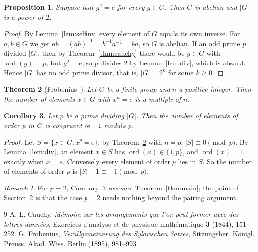 \documentclass[11pt]{amsart}
\newtheorem{theorem}{Theorem}[section]
\newtheorem{proposition}[theorem]{Proposition}
\newtheorem{corollary}[theorem]{Corollary}
\theoremstyle{definition}
\theoremstyle{remark}
\newtheorem*{remark}{Remark}
\DeclareMathOperator{\ord}{ord}
\begin{document}
\begin{proposition}\label{prop:exp2}
Suppose that $g^2=e$ for every $g\in G$. Then $G$ is abelian and $|G|$ is a power of $2$.
\end{proposition}

\begin{proof}
By Lemma~\ref{lem:selfinv} every element of $G$ equals its own inverse. For $a,b\in G$ we get
$ab=(ab)^{-1}=b^{-1}a^{-1}=ba$, so $G$ is abelian. If an odd prime $p$ divided $|G|$, then by
Theorem~\ref{thm:cauchy} there would be $g\in G$ with $\ord(g)=p$; but $g^2=e$, so $p$ divides
$2$ by Lemma~\ref{lem:div}, which is absurd. Hence $|G|$ has no odd prime divisor, that is,
$|G|=2^k$ for some $k\ge 0$.
\end{proof}

\begin{theorem}[Frobenius~\cite{Frobenius}]\label{thm:frob}
Let $G$ be a finite group and $n$ a positive integer. Then the number of elements $x\in G$
with $x^n=e$ is a multiple of $n$.
\end{theorem}

\begin{corollary}\label{cor:modp}
Let $p$ be a prime dividing $|G|$. Then the number of elements of order $p$ in $G$ is
congruent to $-1$ modulo $p$.
\end{corollary}

\begin{proof}
Let $S=\{x\in G: x^p=e\}$; by Theorem~\ref{thm:frob} with $n=p$, $|S|\equiv 0\pmod p$. By
Lemma~\ref{lem:div}, an element $x\in S$ has $\ord(x)\in\{1,p\}$, and $\ord(x)=1$ exactly when
$x=e$. Conversely every element of order $p$ lies in $S$. So the number of elements of order
$p$ is $|S|-1\equiv-1\pmod p$.
\end{proof}

\begin{remark}
For $p=2$, Corollary~\ref{cor:modp} recovers Theorem~\ref{thm:main}; the point of
Section~2 is that the case $p=2$ needs nothing beyond the pairing argument.
\end{remark}

\begin{thebibliography}{9}
 A.-L. Cauchy, \emph{M\'emoire sur les arrangements que l'on peut former
avec des lettres donn\'ees}, Exercices d'analyse et de physique math\'ematique \textbf{3}
(1844), 151--252.
 G. Frobenius, \emph{Verallgemeinerung des Sylowschen Satzes},
Sitzungsber. K\"onigl. Preuss. Akad. Wiss. Berlin (1895), 981--993.
\end{thebibliography}
\end{document}
